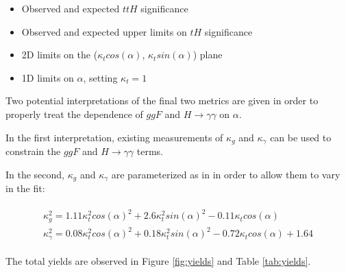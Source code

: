 \begin{itemize}
\item Observed and expected $ttH$ significance
\item Observed and expected upper limits on $tH$ significance
\item 2D limits on the ($\kappa_{t} cos(\alpha)$, $\kappa_{t} sin(\alpha)$) plane
\item 1D limits on $\alpha$, setting $\kappa_{t} = 1$
\end{itemize}

Two potential interpretations of the final two metrics are given in order to properly treat the dependence of $ggF$ and $H \rightarrow \gamma \gamma$ on $\alpha$.

In the first interpretation, existing measurements of $\kappa_{g}$ and $\kappa_{\gamma}$ \cite{couplings80fb} can be used to constrain the $ggF$ and $H \rightarrow \gamma \gamma$ terms. 

In the second, $\kappa_{g}$ and $\kappa_{\gamma}$ are parameterized as in \cite{Ellis} in order to allow them to vary in the fit:

\begin{align}
\begin{aligned}
\kappa_{g}^{2} = 1.11\kappa_{t}^{2}cos(\alpha)^{2} + 2.6\kappa_{t}^{2}sin(\alpha)^{2} - 0.11\kappa_{t}cos(\alpha) \\
\kappa_{\gamma}^{2} = 0.08\kappa_{t}^{2}cos(\alpha)^{2} + 0.18\kappa_{t}^{2}sin(\alpha)^{2} - 0.72\kappa_{t}cos(\alpha) + 1.64
\end{aligned}
\end{align}

The total yields are observed in Figure \ref{fig:yields} and Table \ref{tab:yields}.  


